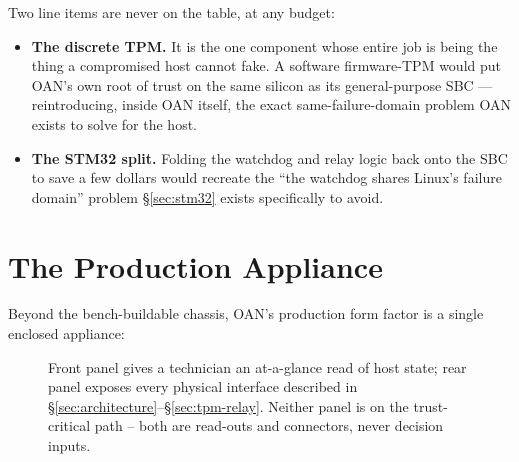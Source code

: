 \documentclass[11pt,a4paper]{article}
\newcommand{\figcap}[1]{\caption{#1}}
\begin{document}
\begin{notebox}
Two line items are never on the table, at any budget:

\begin{itemize}
  \item \textbf{The discrete TPM.} It is the one component whose entire
    job is being the thing a compromised host cannot fake. A software
    firmware-TPM would put OAN's own root of trust on the same silicon
    as its general-purpose SBC --- reintroducing, inside OAN itself,
    the exact same-failure-domain problem OAN exists to solve for the
    host.
  \item \textbf{The STM32 split.} Folding the watchdog and relay logic
    back onto the SBC to save a few dollars would recreate the ``the
    watchdog shares Linux's failure domain'' problem \S\ref{sec:stm32}
    exists specifically to avoid.
\end{itemize}
\end{notebox}

\section{The Production Appliance}
\label{sec:appliance-final}

Beyond the bench-buildable chassis, OAN's production form factor is a
single enclosed appliance:

\begin{figure}[h!]
\centering
{}
\figcap{Front panel gives a technician an at-a-glance read of host state; rear panel exposes every physical interface described in \S\ref{sec:architecture}--\S\ref{sec:tpm-relay}. Neither panel is on the trust-critical path -- both are read-outs and connectors, never decision inputs.}
\label{fig:appliance}
\end{figure}
\end{document}
